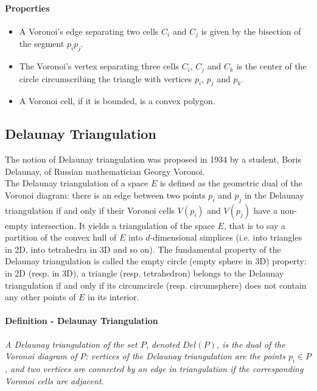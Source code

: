 \paragraph{Properties}
{
\begin {itemize}
\item A Voronoi's edge separating two cells $C_{i}$ and $C_{j}$ is given by the bisection of the segment $p_{i}p_{j}$.
\item The Voronoi's vertex separating three cells $C_{i}$, $C_{j}$ and $C_{k}$ is the center of the circle circumscribing the triangle with vertices $p_{i}$, $p_{j}$ and $p_{k}$.
\item A Voronoi cell, if it is bounded, is a convex polygon.
\end {itemize}
}


\subsection{Delaunay Triangulation}

The notion of Delaunay triangulation was proposed in 1934 by a student, Boris Delaunay, of Russian mathematician Georgy Voronoi. \\
The Delaunay triangulation of a space $E$ is defined as the geometric dual of the Voronoi diagram: there is an edge between two points $p_{i}$ and $p_{j}$ in the Delaunay triangulation if and only if their Voronoi cells $V(p_{i})$ and $V(p_{j})$ have a non-empty intersection. It yields a triangulation of the space $E$, that is to say a partition of the convex hull of $E$ into $d$-dimensional simplices (i.e. into triangles in 2D, into tetrahedra in 3D and so on). The fundamental property of the Delaunay triangulation is called the empty circle (empty sphere in 3D) property: in 2D (resp. in 3D), a triangle (resp. tetrahedron) belongs to the Delaunay triangulation if and only if its circumcircle (resp. circumsphere) does not contain any other points of $E$ in its interior. \\

\paragraph{Definition - Delaunay Triangulation}
{
\it A Delaunay triangulation of the set $P$, denoted $Del(P)$, is the dual of the Voronoi diagram of $P$: vertices of the Delaunay triangulation are the points $p_{i} \in P$, and two vertices are connected by an edge in triangulation if the corresponding Voronoi cells are adjacent.
}

